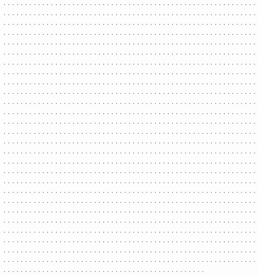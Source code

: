 \documentclass[twocolumn]{revtex4}
\begin{document}
. . . . . . . . . . . . . . . . . . . . . . . . . . . . . . . . . . . . . . . .
. . . . . . . . . . . . . . . . . . . . . . . . . . . . . . . . . . . . . . . .
. . . . . . . . . . . . . . . . . . . . . . . . . . . . . . . . . . . . . . . .
. . . . . . . . . . . . . . . . . . . . . . . . . . . . . . . . . . . . . . . .
. . . . . . . . . . . . . . . . . . . . . . . . . . . . . . . . . . . . . . . .
. . . . . . . . . . . . . . . . . . . . . . . . . . . . . . . . . . . . . . . .
. . . . . . . . . . . . . . . . . . . . . . . . . . . . . . . . . . . . . . . .
. . . . . . . . . . . . . . . . . . . . . . . . . . . . . . . . . . . . . . . .
. . . . . . . . . . . . . . . . . . . . . . . . . . . . . . . . . . . . . . . .
. . . . . . . . . . . . . . . . . . . . . . . . . . . . . . . . . . . . . . . .
. . . . . . . . . . . . . . . . . . . . . . . . . . . . . . . . . . . . . . . .
. . . . . . . . . . . . . . . . . . . . . . . . . . . . . . . . . . . . . . . .
. . . . . . . . . . . . . . . . . . . . . . . . . . . . . . . . . . . . . . . .
. . . . . . . . . . . . . . . . . . . . . . . . . . . . . . . . . . . . . . . .
. . . . . . . . . . . . . . . . . . . . . . . . . . . . . . . . . . . . . . . .
. . . . . . . . . . . . . . . . . . . . . . . . . . . . . . . . . . . . . . . .
. . . . . . . . . . . . . . . . . . . . . . . . . . . . . . . . . . . . . . . .
. . . . . . . . . . . . . . . . . . . . . . . . . . . . . . . . . . . . . . . .
. . . . . . . . . . . . . . . . . . . . . . . . . . . . . . . . . . . . . . . .
. . . . . . . . . . . . . . . . . . . . . . . . . . . . . . . . . . . . . . . .
. . . . . . . . . . . . . . . . . . . . . . . . . . . . . . . . . . . . . . . .
. . . . . . . . . . . . . . . . . . . . . . . . . . . . . . . . . . . . . . . .
. . . . . . . . . . . . . . . . . . . . . . . . . . . . . . . . . . . . . . . .
. . . . . . . . . . . . . . . . . . . . . . . . . . . . . . . . . . . . . . . .
. . . . . . . . . . . . . . . . . . . . . . . . . . . . . . . . . . . . . . . .
. . . . . . . . . . . . . . . . . . . . . . . . . . . . . . . . . . . . . . . .
. . . . . . . . . . . . . . . . . . . . . . . . . . . . . . . . . . . . . . . .
. . . . . . . . . . . . . . . . . . . . . . . . . . . . . . . . . . . . . . . .
. . . . . . . . . . . . . . . . . . . . . . . . . . . . . . . . . . . . . . . .
. . . . . . . . . . . . . . . . . . . . . . . . . . . . . . . . . . . . . . . .
. . . . . . . . . . . . . . . . . . . . . . . . . . . . . . . . . . . . . . . .
. . . . . . . . . . . . . . . . . . . . . . . . . . . . . . . . . . . . . . . .
. . . . . . . . . . . . . . . . . . . . . . . . . . . . . . . . . . . . . . . .
. . . . . . . . . . . . . . . . . . . . . . . . . . . . . . . . . . . . . . . .
. . . . . . . . . . . . . . . . . . . . . . . . . . . . . . . . . . . . . . . .
. . . . . . . . . . . . . . . . . . . . . . . . . . . . . . . . . . . . . . . .
. . . . . . . . . . . . . . . . . . . . . . . . . . . . . . . . . . . . . . . .
. . . . . . . . . . . . . . . . . . . . . . . . . . . . . . . . . . . . . . . .
. . . . . . . . . . . . . . . . . . . . . . . . . . . . . . . . . . . . . . . .
. . . . . . . . . . . . . . . . . . . . . . . . . . . . . . . . . . . . . . . .
. . . . . . . . . . . . . . . . . . . . . . . . . . . . . . . . . . . . . . . .
\end{document}
